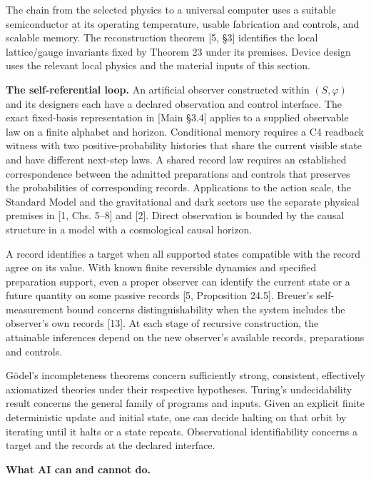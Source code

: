 \documentclass[
]{article}
\begin{document}
The chain from the selected physics to a universal computer uses a
suitable semiconductor at its operating temperature, usable fabrication
and controls, and scalable memory. The reconstruction theorem {[}5,
§3{]} identifies the local lattice/gauge invariants fixed by Theorem 23
under its premises. Device design uses the relevant local physics and
the material inputs of this section.

\textbf{The self-referential loop.} An artificial observer constructed
within \((S, \varphi)\) and its designers each have a declared
observation and control interface. The exact fixed-basis representation
in {[}Main §3.4{]} applies to a supplied observable law on a finite
alphabet and horizon. Conditional memory requires a C4 readback witness
with two positive-probability histories that share the current visible
state and have different next-step laws. A shared record law requires an
established correspondence between the admitted preparations and
controls that preserves the probabilities of corresponding records.
Applications to the action scale, the Standard Model and the
gravitational and dark sectors use the separate physical premises in
{[}1, Chs. 5--8{]} and {[}2{]}. Direct observation is bounded by the
causal structure in a model with a cosmological causal horizon.

A record identifies a target when all supported states compatible with
the record agree on its value. With known finite reversible dynamics and
specified preparation support, even a proper observer can identify the
current state or a future quantity on some passive records {[}5,
Proposition 24.5{]}. Breuer's self-measurement bound concerns
distinguishability when the system includes the observer's own records
{[}13{]}. At each stage of recursive construction, the attainable
inferences depend on the new observer's available records, preparations
and controls.

Gödel's incompleteness theorems concern sufficiently strong, consistent,
effectively axiomatized theories under their respective hypotheses.
Turing's undecidability result concerns the general family of programs
and inputs. Given an explicit finite deterministic update and initial
state, one can decide halting on that orbit by iterating until it halts
or a state repeats. Observational identifiability concerns a target and
the records at the declared interface.

\textbf{What AI can and cannot do.}
\end{document}
